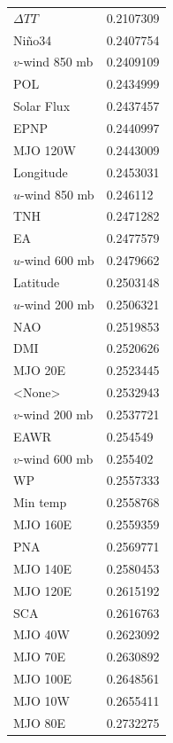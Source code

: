 \documentclass[landscape,a0paper,fontscale=0.3]{baposter} %
\makeatletter
\def\zapcolorreset{\let\reset@color\relax\ignorespaces}
\def\colorrows#1{\noalign{\aftergroup\zapcolorreset#1}\ignorespaces}
\makeatother
\begin{document}
\begin{poster}
{\begin{minipage}[b]{.7\textwidth}
{\begin{tabular}{ll}
    $\Delta TT$ & 0.2107309 \\
    Ni\~{n}o34                & 0.2407754 \\
    $v$-wind 850 mb          & 0.2409109 \\
    POL                   & 0.2434999 \\
    Solar Flux             & 0.2437457 \\
    EPNP                  & 0.2440997 \\
    MJO 120W              & 0.2443009 \\
    Longitude              & 0.2453031 \\
    $u$-wind 850 mb          & 0.246112  \\
    TNH                   & 0.2471282 \\
    EA                    & 0.2477579 \\
    $u$-wind 600 mb          & 0.2479662 \\
    Latitude             & 0.2503148 \\
    $u$-wind 200 mb          & 0.2506321 \\
    NAO                   & 0.2519853 \\
    DMI                   & 0.2520626 \\
    MJO 20E               & 0.2523445 \\\hline
    \colorrows{\color{black}}
    <None>                & 0.2532943 \\\hline
    $v$-wind 200 mb          & 0.2537721 \\
    EAWR                  & 0.254549  \\
    $v$-wind 600 mb          & 0.255402  \\
    WP                    & 0.2557333 \\
    Min temp                  & 0.2558768 \\
    MJO 160E              & 0.2559359 \\
    PNA                   & 0.2569771 \\
    MJO 140E              & 0.2580453 \\
    MJO 120E              & 0.2615192 \\
    SCA                   & 0.2616763 \\
    MJO 40W               & 0.2623092 \\
    MJO 70E               & 0.2630892 \\
    MJO 100E              & 0.2648561 \\
    MJO 10W               & 0.2655411 \\
    MJO 80E               & 0.2732275 \\\hline
\end{tabular}
}
\vspace{.01em}
\end{minipage}
}


\end{poster}
\end{document}
